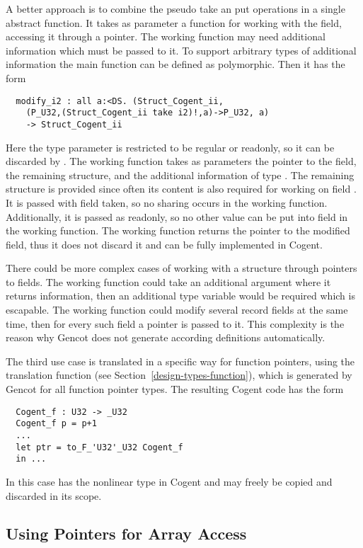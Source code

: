 A better approach is to combine the pseudo take an put operations in a single abstract function. It takes
as parameter a function for working with the field, accessing it through a pointer. The working function
may need additional information which must be passed to it. To support arbitrary types of additional information
the main function can be defined as polymorphic. Then it has the form
\begin{verbatim}
  modify_i2 : all a:<DS. (Struct_Cogent_ii,
    (P_U32,(Struct_Cogent_ii take i2)!,a)->P_U32, a)
    -> Struct_Cogent_ii
\end{verbatim}
Here the type parameter  is restricted to be regular or readonly, so it can be discarded by .
The working function takes as parameters the pointer to the field, the remaining structure, and the additional information
of type . The remaining structure is provided since often its content is also required for working on 
field . It is passed with field  taken, so no sharing occurs in the working function. Additionally,
it is passed as readonly, so no other value can be put into field  in the working function. The working
function returns the pointer to the modified field, thus it does not discard it and can be fully implemented in Cogent.

There could be more complex cases of working with a structure through pointers to fields. The working function could
take an additional argument where it returns information, then an additional type variable  would be required
which is escapable. The working function could modify several record fields at the same time, then for every such field
a pointer is passed to it. This complexity is the reason why Gencot does not generate according definitions automatically.

The third use case is translated in a specific way for function pointers, using the translation function
 (see Section~\ref{design-types-function}), which is generated by Gencot for all function
pointer types. The resulting Cogent code has the form
\begin{verbatim}
  Cogent_f : U32 -> _U32
  Cogent_f p = p+1
  ...
  let ptr = to_F_'U32'_U32 Cogent_f
  in ...
\end{verbatim}
In this case  has the nonlinear type  in Cogent and may freely be copied and
discarded in its scope.

\subsection{Using Pointers for Array Access}
\label{app-trans-arrpoint}

